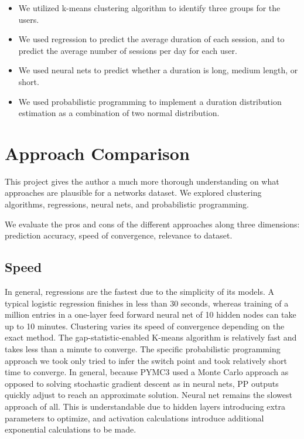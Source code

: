 \documentclass[]{article}
\begin{document}
\begin{itemize}
\item
We utilized k-means clustering algorithm to identify three groups for the users.
\item
We used regression to predict the average duration of each session, and to predict the average number of sessions per day for each user.
\item
We used neural nets to predict whether a duration is long, medium length, or short.
\item
We used probabilistic programming to implement a duration distribution estimation as a combination of two normal distribution.
\end{itemize}

\newpage
\section{Approach Comparison}

This project gives the author a much more thorough understanding on what approaches are plausible for a networks dataset. We explored clustering algorithms, regressions, neural nets, and probabilistic programming.

We evaluate the pros and cons of the different approaches along three dimensions: prediction accuracy, speed of convergence, relevance to dataset.

\subsection{Speed}

In general, regressions are the fastest due to the simplicity of its models. A typical logistic regression finishes in less than 30 seconds, whereas training of a million entries in a one-layer feed forward neural net of 10 hidden nodes can take up to 10 minutes. Clustering varies its speed of convergence depending on the exact method. The gap-statistic-enabled K-means algorithm is relatively fast and takes less than a minute to converge. The specific probabilistic programming approach we took only tried to infer the switch point and took relatively short time to converge. In general, because PYMC3 used a Monte Carlo approach as opposed to solving stochastic gradient descent as in neural nets, PP outputs quickly adjust to reach an approximate solution. Neural net remains the slowest approach of all. This is understandable due to hidden layers introducing extra parameters to optimize, and activation calculations introduce additional exponential calculations to be made.
\end{document}
